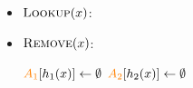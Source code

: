 \begin{itemize}
        \begin{itemize}
        \item$\textsc{Lookup}(x)$: 
            \begin{algorithmic}
                        \State \Return \yes
                    \Else
                        \State \Return \no
                    \EndIf
            \end{algorithmic}
        \item$\textsc{Remove}(x)$: 
                    \begin{algorithmic}
                        \State $\textcolor{orange}{A_1}[h_1(x)] \gets \emptyset$
                        \State $\textcolor{orange}{A_2}[h_2(x)] \gets \emptyset$
                \EndIf
            \end{algorithmic}
    \end{itemize}


\end{itemize}
